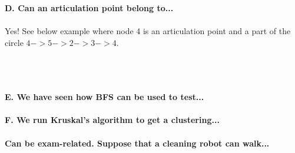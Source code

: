 \documentclass[12pt,oneside,reqno]{amsart}
\begin{document}
\textbf{D. Can an articulation point belong to...}\\\\
Yes! See below example where node 4 is an articulation point and a part of the circle $4->5->2->3->4$.\\\\
\\\\
\textbf{E. We have seen how BFS can be used to test...}\\\\

\textbf{F. We run Kruskal’s algorithm to get a clustering...}\\\\

\textbf{Can be exam-related. Suppose that a cleaning robot can walk...}\\\\
\end{document}
